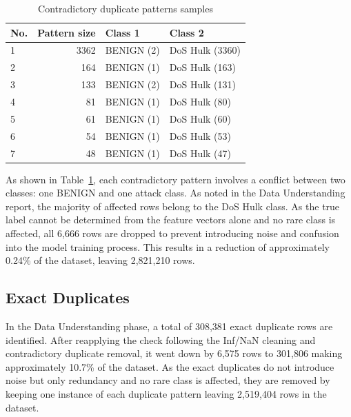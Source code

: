 \documentclass[12pt,a4paper]{article}
\begin{document}
\begin{table}[H]
    \centering
    \caption{Contradictory duplicate patterns samples}
    \vskip0.1cm
    \label{tab:con_pat}
    \begin{tabular}{|l|r|l|l|}
        \hline
        \textbf{No.} & \textbf{Pattern size} & \textbf{Class 1} & \textbf{Class 2}  \\
        \hline
        1       &3362  & BENIGN (2)            & DoS Hulk (3360)  \\
        \hline
        2       &164  & BENIGN (1)            & DoS Hulk (163)   \\
        \hline
        3       &133  & BENIGN (2)            & DoS Hulk (131)   \\
        \hline
        4       &81  & BENIGN (1)            & DoS Hulk (80)    \\
        \hline
        5       &61  & BENIGN (1)            & DoS Hulk (60)    \\
        \hline
        6       &54  & BENIGN (1)            & DoS Hulk (53)    \\
        \hline
        7       &48  & BENIGN (1)            & DoS Hulk (47)    \\
        \hline
    \end{tabular}
\end{table}

As shown in Table~\ref{tab:con_pat}, each contradictory pattern involves a conflict between two classes: one BENIGN and one attack class. As noted in the Data Understanding report, the majority of affected rows belong to the DoS Hulk class. As the true label cannot be determined from the feature vectors alone and no rare class is affected, all 6,666 rows are dropped to prevent introducing noise and confusion into the model training process. This results in a reduction of approximately 0.24\% of the dataset, leaving 2,821,210 rows.

\subsection{Exact Duplicates}
In the Data Understanding phase, a total of 308,381 exact duplicate rows are identified. After reapplying the check following the Inf/NaN cleaning and contradictory duplicate removal, it went down by 6,575 rows to 301,806 making approximately 10.7\% of the dataset. As the exact duplicates do not introduce noise but only redundancy and no rare class is affected, they are removed by keeping one instance of each duplicate pattern leaving 2,519,404 rows in the dataset.       
\end{document}
